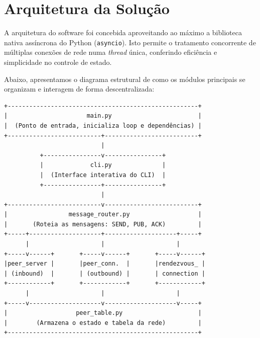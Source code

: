 \documentclass[12pt,a4paper]{article}
\begin{document}
\section{Arquitetura da Solução}
A arquitetura do software foi concebida aproveitando ao máximo a biblioteca nativa assíncrona do Python (\texttt{asyncio}). Isto permite o tratamento concorrente de múltiplas conexões de rede numa \textit{thread} única, conferindo eficiência e simplicidade no controle de estado.


Abaixo, apresentamos o diagrama estrutural de como os módulos principais se organizam e interagem de forma descentralizada:

\begin{lstlisting}[basicstyle=\ttfamily\small, numbers=none]
+-----------------------------------------------------+
|                      main.py                        |
|  (Ponto de entrada, inicializa loop e dependências) |
+--------------------------+--------------------------+
                           |
          +----------------v----------------+
          |             cli.py              |
          |  (Interface interativa do CLI)  |
          +----------------+----------------+
                           |
+--------------------------v--------------------------+
|                 message_router.py                   |
|       (Roteia as mensagens: SEND, PUB, ACK)         |
+-----+--------------------+--------------------+-----+
      |                    |                    |
+-----v------+       +-----v------+       +-----v------+
|peer_server |       |peer_conn.  |       |rendezvous_ |
| (inbound)  |       | (outbound) |       | connection |
+------------+       +------------+       +------------+
      |                    |                    |
+-----v--------------------v--------------------v-----+
|                   peer_table.py                     |
|        (Armazena o estado e tabela da rede)         |
+-----------------------------------------------------+
\end{lstlisting}
\end{document}
